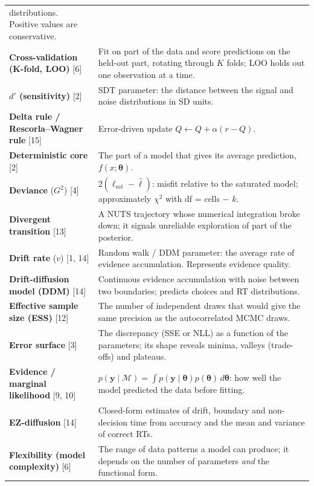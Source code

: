 \begin{longtable}[]{@{}
  >{\raggedright\arraybackslash}p{}
  >{\raggedright\arraybackslash}p{}@{}}
distributions. Positive values are conservative. \\
\textbf{Cross-validation (K-fold, LOO)} {[}6{]} & Fit on part of the
data and score predictions on the held-out part, rotating through \(K\)
folds; LOO holds out one observation at a time. \\
\textbf{\(d'\) (sensitivity)} {[}2{]} & SDT parameter: the distance
between the signal and noise distributions in SD units. \\
\textbf{Delta rule / Rescorla--Wagner rule} {[}15{]} & Error-driven
update \(Q \leftarrow Q + \alpha(r - Q)\). \\
\textbf{Deterministic core} {[}2{]} & The part of a model that gives its
average prediction, \(f(x;\boldsymbol\theta)\). \\
\textbf{Deviance} (\(G^2\)) {[}4{]} &
\(2(\ell_{\text{sat}} - \hat\ell)\): misfit relative to the saturated
model; approximately \(\chi^2\) with df = cells − \(k\). \\
\textbf{Divergent transition} {[}13{]} & A NUTS trajectory whose
numerical integration broke down; it signals unreliable exploration of
part of the posterior. \\
\textbf{Drift rate} (\(v\)) {[}1, 14{]} & Random walk / DDM parameter:
the average rate of evidence accumulation. Represents evidence
quality. \\
\textbf{Drift-diffusion model (DDM)} {[}14{]} & Continuous evidence
accumulation with noise between two boundaries; predicts choices and RT
distributions. \\
\textbf{Effective sample size (ESS)} {[}12{]} & The number of
independent draws that would give the same precision as the
autocorrelated MCMC draws. \\
\textbf{Error surface} {[}3{]} & The discrepancy (SSE or NLL) as a
function of the parameters; its shape reveals minima, valleys
(trade-offs) and plateaus. \\
\textbf{Evidence / marginal likelihood} {[}9, 10{]} &
\(p(\mathbf{y}\mid\mathcal{M}) = \int p(\mathbf{y}\mid\boldsymbol\theta)p(\boldsymbol\theta)\,d\boldsymbol\theta\):
how well the model predicted the data before fitting. \\
\textbf{EZ-diffusion} {[}14{]} & Closed-form estimates of drift,
boundary and non-decision time from accuracy and the mean and variance
of correct RTs. \\
\textbf{Flexibility (model complexity)} {[}6{]} & The range of data
patterns a model can produce; it depends on the number of parameters
\emph{and} the functional form. \\

\end{longtable}
